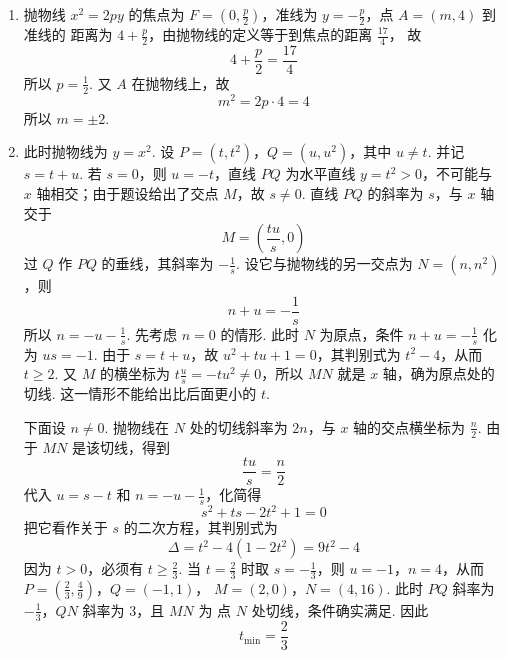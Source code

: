 \begin{solution}
\begin{enumerate}
\item 抛物线 \(x^2=2py\) 的焦点为
\(F=(0,\frac p2)\)，准线为 \(y=-\frac p2\)，点 \(A=(m,4)\) 到准线的
距离为 \(4+\frac p2\)，由抛物线的定义等于到焦点的距离 \(\frac{17}{4}\)，
故
\[
4+\frac p2=\frac{17}{4}
\]
所以 \(p=\frac12\).
又 \(A\) 在抛物线上，故
\[
m^2=2p\cdot4=4
\]
所以 \(m=\pm2\).
\item 此时抛物线为 \(y=x^2\). 设
\(P=(t,t^2)\)，\(Q=(u,u^2)\)，其中 \(u\neq t\).
并记 \(s=t+u\). 若 \(s=0\)，则 \(u=-t\)，直线 \(PQ\) 为水平直线
\(y=t^2>0\)，不可能与 \(x\) 轴相交；由于题设给出了交点 \(M\)，故 \(s\ne0\).
直线 \(PQ\) 的斜率为 \(s\)，与 \(x\) 轴交于
\[
M=\left(\frac{tu}{s},0\right)
\]
过 \(Q\) 作 \(PQ\) 的垂线，其斜率为 \(-\frac{1}{s}\). 设它与抛物线的另一交点为
\(N=(n,n^2)\)，则
\[
n+u=-\frac1s
\]
所以 \(n=-u-\frac1s\).
先考虑 \(n=0\) 的情形. 此时 \(N\) 为原点，条件
\(n+u=-\frac{1}{s}\) 化为 \(us=-1\). 由于 \(s=t+u\)，故
\(u^2+tu+1=0\)，其判别式为 \(t^2-4\)，从而 \(t\geqslant2\).
又 \(M\) 的横坐标为 \(t\frac{u}{s}=-tu^2\neq0\)，所以 \(MN\) 就是
\(x\) 轴，确为原点处的切线. 这一情形不能给出比后面更小的 \(t\).

下面设 \(n\neq0\). 抛物线在 \(N\) 处的切线斜率为 \(2n\)，与 \(x\) 轴的交点横坐标为
\(\frac{n}{2}\). 由于 \(MN\) 是该切线，得到
\[
\frac{tu}{s}=\frac n2
\]
代入 \(u=s-t\) 和 \(n=-u-\frac{1}{s}\)，化简得
\[
s^2+ts-2t^2+1=0
\]
把它看作关于 \(s\) 的二次方程，其判别式为
\[
\Delta=t^2-4(1-2t^2)=9t^2-4
\]
因为 \(t>0\)，必须有 \(t\geqslant\frac23\). 当
\(t=\frac23\) 时取 \(s=-\frac13\)，则 \(u=-1\)，\(n=4\)，从而
\(P=\left(\frac23,\frac49\right)\)，\(Q=(-1,1)\)，
\(M=(2,0)\)，\(N=(4,16)\).
此时 \(PQ\) 斜率为 \(-\frac13\)，\(QN\) 斜率为 \(3\)，且 \(MN\) 为
点 \(N\) 处切线，条件确实满足. 因此
\[
t_{\min}=\frac23
\]
\end{enumerate}
\end{solution}
